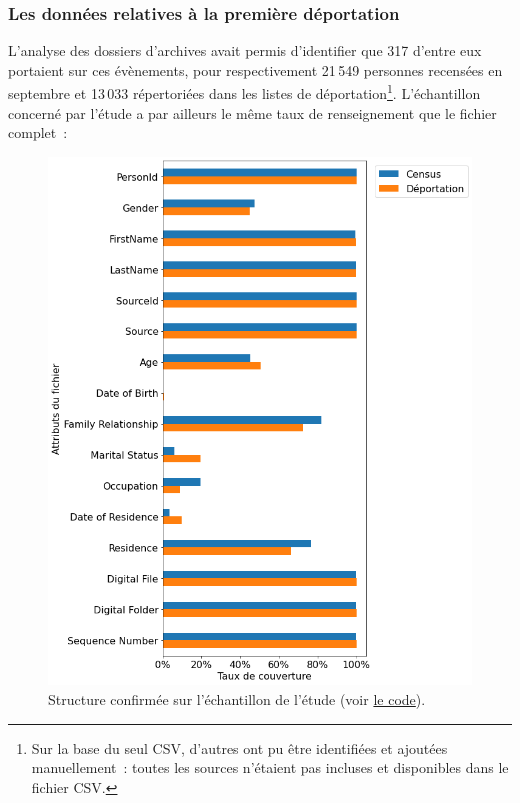 \documentclass[a4paper,12pt,twoside]{book}
\begin{document}
                \subsubsection{Les données relatives à la première déportation}
                
                    L'analyse des dossiers d'archives avait permis d'identifier que 317 d'entre eux portaient sur ces évènements, pour respectivement 21\,549 personnes recensées en septembre et 13\,033 répertoriées dans les listes de déportation\footnote{Sur la base du seul CSV, d'autres ont pu être identifiées et ajoutées manuellement~: toutes les sources n'étaient pas incluses et disponibles dans le fichier CSV.}. L'échantillon concerné par l'étude a par ailleurs le même taux de renseignement que le fichier complet~: 
                    \begin{figure}[!ht]
            			\centering
                        \includegraphics[width=12cm]{images/scope_content.png}
                        \caption{Structure confirmée sur l'échantillon de l'étude (voir \hyperref[analyse2]{le code}).}
                        \label{fig11}
                    \end{figure}
                    
\end{document}

